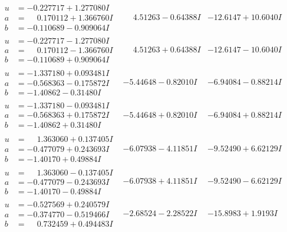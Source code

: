 \documentclass[1p]{elsarticle_modified}
\theoremstyle{definition}
\begin{document}
$$\begin{array}{c|c|c}
\begin{aligned}
u &= -0.227717 + 1.277080 I \\
a &= \phantom{-}0.170112 + 1.366760 I \\
b &= -0.110689 - 0.909064 I\end{aligned}
 & \phantom{-}4.51263 - 0.64388 I & -12.6147 + 10.6040 I \\ \hline\begin{aligned}
u &= -0.227717 - 1.277080 I \\
a &= \phantom{-}0.170112 - 1.366760 I \\
b &= -0.110689 + 0.909064 I\end{aligned}
 & \phantom{-}4.51263 + 0.64388 I & -12.6147 - 10.6040 I \\ \hline\begin{aligned}
u &= -1.337180 + 0.093481 I \\
a &= -0.568363 - 0.175872 I \\
b &= -1.40862 - 0.31480 I\end{aligned}
 & -5.44648 - 0.82010 I & -6.94084 - 0.88214 I \\ \hline\begin{aligned}
u &= -1.337180 - 0.093481 I \\
a &= -0.568363 + 0.175872 I \\
b &= -1.40862 + 0.31480 I\end{aligned}
 & -5.44648 + 0.82010 I & -6.94084 + 0.88214 I \\ \hline\begin{aligned}
u &= \phantom{-}1.363060 + 0.137405 I \\
a &= -0.477079 + 0.243693 I \\
b &= -1.40170 + 0.49884 I\end{aligned}
 & -6.07938 - 4.11851 I & -9.52490 + 6.62129 I \\ \hline\begin{aligned}
u &= \phantom{-}1.363060 - 0.137405 I \\
a &= -0.477079 - 0.243693 I \\
b &= -1.40170 - 0.49884 I\end{aligned}
 & -6.07938 + 4.11851 I & -9.52490 - 6.62129 I \\ \hline\begin{aligned}
u &= -0.527569 + 0.240579 I \\
a &= -0.374770 - 0.519466 I \\
b &= \phantom{-}0.732459 + 0.494483 I\end{aligned}
 & -2.68524 - 2.28522 I & -15.8983 + 1.9193 I \\ \hline\begin{aligned}

\end{aligned}
\end{array}$$
\end{document}
